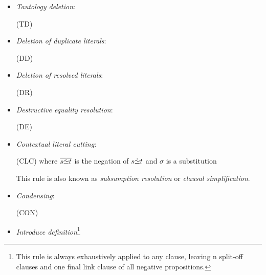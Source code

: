 \documentclass{report}
\begin{document}
\begin{definition}
\begin{itemize}
 \item \emph{Tautology deletion}:

   \bigskip (TD) 

 \item \emph{Deletion of duplicate literals}:

   \bigskip (DD) 

 \item \emph{Deletion of resolved literals}:

   \bigskip (DR) 

 \item \emph{Destructive equality resolution}:

   \bigskip (DE) 

 \item \emph{Contextual literal cutting}:

   \bigskip (CLC)  {where
     $\overline{s\dot{\simeq}t}$ is the negation of $s\dot{\simeq}t$ and
     $\sigma$ is a substitution}

   This rule is also known as \emph{subsumption resolution} or
   \emph{clausal simplification}.


\item \emph{Condensing}:

   \bigskip (CON) 



 \item \emph{Introduce definition}\footnote{This rule is always exhaustively applied to
     any clause, leaving n split-off clauses and one final link clause of
     all negative propositions.}


\end{itemize}
\end{definition}
\end{document}
